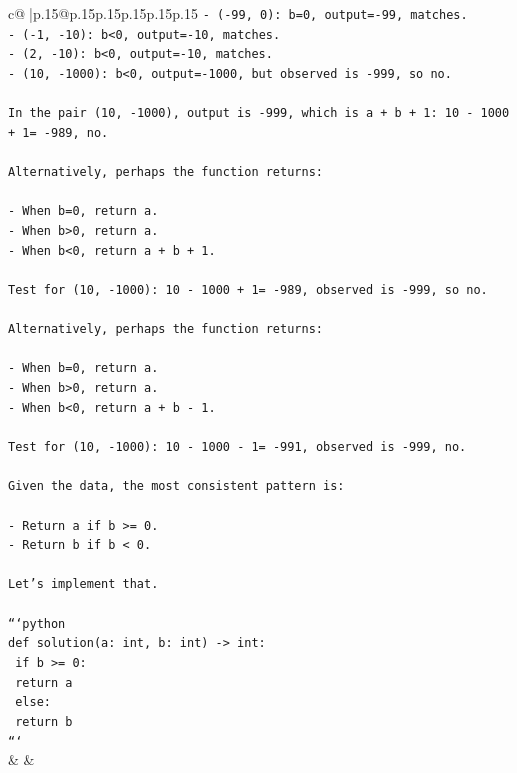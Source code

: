 \documentclass{article}
\begin{document}
{\begin{supertabular}{c@{$\;$}|p{.15\linewidth}@{}p{.15\linewidth}p{.15\linewidth}p{.15\linewidth}p{.15\linewidth}p{.15\linewidth}}
{{{\texttt{{-} ({-}99, 0): b=0, output={-}99, matches.} \\
\texttt{{-} ({-}1, {-}10): b<0, output={-}10, matches.} \\
\texttt{{-} (2, {-}10): b<0, output={-}10, matches.} \\
\texttt{{-} (10, {-}1000): b<0, output={-}1000, but observed is {-}999, so no.} \\
\\ 
\texttt{In the pair (10, {-}1000), output is {-}999, which is a + b + 1: 10 {-} 1000 + 1= {-}989, no.} \\
\\ 
\texttt{Alternatively, perhaps the function returns:} \\
\\ 
\texttt{{-} When b=0, return a.} \\
\texttt{{-} When b>0, return a.} \\
\texttt{{-} When b<0, return a + b + 1.} \\
\\ 
\texttt{Test for (10, {-}1000): 10 {-} 1000 + 1= {-}989, observed is {-}999, so no.} \\
\\ 
\texttt{Alternatively, perhaps the function returns:} \\
\\ 
\texttt{{-} When b=0, return a.} \\
\texttt{{-} When b>0, return a.} \\
\texttt{{-} When b<0, return a + b {-} 1.} \\
\\ 
\texttt{Test for (10, {-}1000): 10 {-} 1000 {-} 1= {-}991, observed is {-}999, no.} \\
\\ 
\texttt{Given the data, the most consistent pattern is:} \\
\\ 
\texttt{{-} Return a if b >= 0.} \\
\texttt{{-} Return b if b < 0.} \\
\\ 
\texttt{Let's implement that.} \\
\\ 
\texttt{```python} \\
\texttt{def solution(a: int, b: int) {-}> int:} \\
\texttt{    if b >= 0:} \\
\texttt{        return a} \\
\texttt{    else:} \\
\texttt{        return b} \\
\texttt{```} \\
            }
        }
    }
    & & \\ \\


\end{supertabular}}
\end{document}
